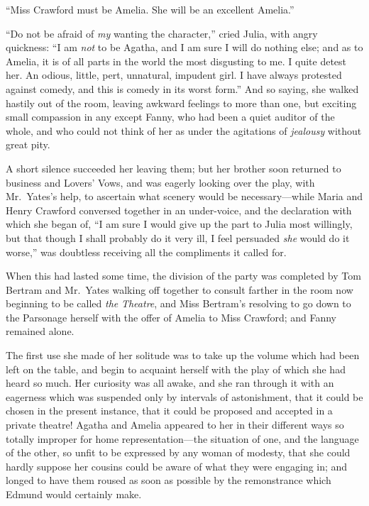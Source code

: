 \documentclass{article}
\begin{document}
``Miss Crawford must be Amelia.  She will be an excellent Amelia.''

``Do not be afraid of \emph{my} wanting the character,''
cried Julia, with angry quickness:  ``I am \emph{not} to be Agatha,
and I am sure I will do nothing else; and as to Amelia,
it is of all parts in the world the most disgusting to me.
I quite detest her.  An odious, little, pert, unnatural,
impudent girl.  I have always protested against comedy,
and this is comedy in its worst form.''  And so saying,
she walked hastily out of the room, leaving awkward feelings
to more than one, but exciting small compassion in any
except Fanny, who had been a quiet auditor of the whole,
and who could not think of her as under the agitations of
\emph{jealousy} without great pity.

A short silence succeeded her leaving them; but her brother
soon returned to business and Lovers' Vows, and was
eagerly looking over the play, with Mr.\ Yates's help,
to ascertain what scenery would be necessary---while Maria
and Henry Crawford conversed together in an under-voice,
and the declaration with which she began of, ``I am
sure I would give up the part to Julia most willingly,
but that though I shall probably do it very ill,
I feel persuaded \emph{she} would do it worse,'' was doubtless
receiving all the compliments it called for.

When this had lasted some time, the division of the party
was completed by Tom Bertram and Mr.\ Yates walking off
together to consult farther in the room now beginning
to be called \emph{the} \emph{Theatre}, and Miss Bertram's resolving
to go down to the Parsonage herself with the offer
of Amelia to Miss Crawford; and Fanny remained alone.

The first use she made of her solitude was to take up
the volume which had been left on the table, and begin
to acquaint herself with the play of which she had heard
so much.  Her curiosity was all awake, and she ran
through it with an eagerness which was suspended only
by intervals of astonishment, that it could be chosen
in the present instance, that it could be proposed
and accepted in a private theatre!  Agatha and Amelia
appeared to her in their different ways so totally
improper for home representation---the situation of one,
and the language of the other, so unfit to be expressed
by any woman of modesty, that she could hardly suppose
her cousins could be aware of what they were engaging in;
and longed to have them roused as soon as possible
by the remonstrance which Edmund would certainly make.
\end{document}
